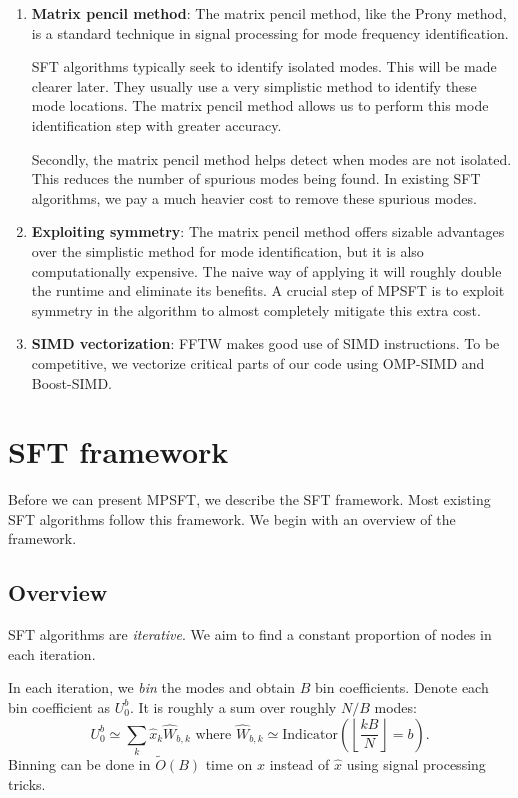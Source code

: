 \documentclass[10pt]{article}
\begin{document}
\begin{enumerate}
\item \textbf{Matrix pencil method}: The matrix pencil method, like the Prony method, is a standard technique in signal processing for mode frequency identification.

SFT algorithms typically seek to identify isolated modes. This will be made clearer later. They usually use a very simplistic method to identify these mode locations. The matrix pencil method allows us to perform this mode identification step with greater accuracy.

Secondly, the matrix pencil method helps detect when modes are not isolated. This reduces the number of spurious modes being found. In existing SFT algorithms, we pay a much heavier cost to remove these spurious modes.

\item \textbf{Exploiting symmetry}: The matrix pencil method offers sizable advantages over the simplistic method for mode identification, but it is also computationally expensive. The naive way of applying it will roughly double the runtime and eliminate its benefits. A crucial step of MPSFT is to exploit symmetry in the algorithm to almost completely mitigate this extra cost.

\item \textbf{SIMD vectorization}: FFTW makes good use of SIMD instructions. To be competitive, we vectorize critical parts of our code using OMP-SIMD and Boost-SIMD.

\end{enumerate}

\section{SFT framework}

Before we can present MPSFT, we describe the SFT framework. Most existing SFT algorithms follow this framework. We begin with an overview of the framework.

\subsection{Overview}\label{sec:overview}

SFT algorithms are \emph{iterative}. We aim to find a constant proportion of nodes in each iteration.

In each iteration, we \emph{bin} the modes and obtain $B$ bin coefficients. Denote each bin coefficient as $U^b_0$. It is roughly a sum over roughly $N/B$ modes:
$$U^b_0 \simeq \sum_k \hat{x}_k \hat{W}_{b,k} \text{ where } \hat{W}_{b,k} \simeq \text{Indicator}\left(\left\lfloor \frac{kB}{N} \right\rfloor = b\right).$$
Binning can be done in $\tilde{O}(B)$ time on $x$ instead of $\hat{x}$ using signal processing tricks.
\end{document}

